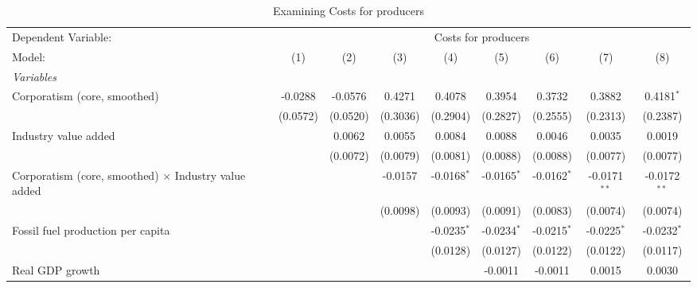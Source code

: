 
\begin{table}[htbp]
   \caption{Examining Costs for producers}
   \centering
   \begin{tabular}{lcccccccc}
      \tabularnewline \midrule \midrule
      Dependent Variable: & \multicolumn{8}{c}{Costs for producers}\\
      Model:                                                      & (1)      & (2)      & (3)      & (4)           & (5)           & (6)           & (7)            & (8)\\  
      \midrule
      \emph{Variables}\\
      Corporatism (core, smoothed)                                & -0.0288  & -0.0576  & 0.4271   & 0.4078        & 0.3954        & 0.3732        & 0.3882         & 0.4181$^{*}$\\   
                                                                  & (0.0572) & (0.0520) & (0.3036) & (0.2904)      & (0.2827)      & (0.2555)      & (0.2313)       & (0.2387)\\   
      Industry value added                                        &          & 0.0062   & 0.0055   & 0.0084        & 0.0088        & 0.0046        & 0.0035         & 0.0019\\   
                                                                  &          & (0.0072) & (0.0079) & (0.0081)      & (0.0088)      & (0.0088)      & (0.0077)       & (0.0077)\\   
      Corporatism (core, smoothed) $\times$ Industry value added  &          &          & -0.0157  & -0.0168$^{*}$ & -0.0165$^{*}$ & -0.0162$^{*}$ & -0.0171$^{**}$ & -0.0172$^{**}$\\   
                                                                  &          &          & (0.0098) & (0.0093)      & (0.0091)      & (0.0083)      & (0.0074)       & (0.0074)\\   
      Fossil fuel production per capita                           &          &          &          & -0.0235$^{*}$ & -0.0234$^{*}$ & -0.0215$^{*}$ & -0.0225$^{*}$  & -0.0232$^{*}$\\   
                                                                  &          &          &          & (0.0128)      & (0.0127)      & (0.0122)      & (0.0122)       & (0.0117)\\   
      Real GDP growth                                             &          &          &          &               & -0.0011       & -0.0011       & 0.0015         & 0.0030\\   

\end{tabular}
\end{table}
